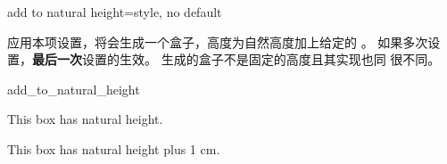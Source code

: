 \begin{docTcbKey}[][doc new=2016-02-16]{add to natural height}{=}{style, no default}

应用本项设置，将会生成一个盒子，高度为自然高度加上给定的 。
如果多次设置，{\bf 最后一次}设置的生效。 生成的盒子不是固定的高度且其实现也同  很不同。
\begin{exdispExample}{add_to_natural_height}

\begin{tcolorbox}
  This box has natural height.
\end{tcolorbox}
\begin{tcolorbox}[add to natural height=1cm]
  This box has natural height plus 1 cm.
\end{tcolorbox}
\end{exdispExample}
\end{docTcbKey}



